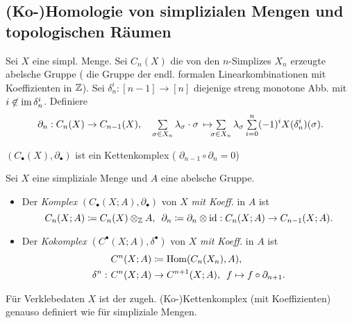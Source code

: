 \documentclass{cheat-sheet}
\newcommand{\nspace}[1]{\foreach \i in {1,...,#1}{ \! }} %
\begin{document}
\begin{samepage}
  \subsection{(Ko-)Homologie von simplizialen Mengen und topologischen Räumen}
\end{samepage}

\begin{defn}
  Sei $X$ eine simpl. Menge. Sei $C_n(X)$ die von den $n$-Simplizes $X_n$ erzeugte abelsche Gruppe (\dh{} die Gruppe der endl. formalen Linearkombinationen mit Koeffizienten in $\mathbb{Z}$). Sei $\delta_n^i : [n{-}1] \to [n]$ diejenige streng monotone Abb. mit $i \not\in \operatorname{im} \delta_n^i$. Definiere
  \[
    \partial_n : C_n(X) \to C_{n-1}(X), \quad
    \sum_{\sigma \in X_n} \lambda_\sigma \cdot \sigma \, \mapsto \nspace{3} \sum_{\sigma \in X_n} \lambda_\sigma \sum_{i=0}^n (-1)^i X(\delta_n^i)(\sigma).
  \]
\end{defn}

\begin{prop}
  $(C_\bullet(X),\partial_\bullet)$ ist ein Kettenkomplex (\dh{} $\partial_{n-1} \circ \partial_n = 0$)
\end{prop}

\begin{defn}
  Sei $X$ eine simpliziale Menge und $A$ eine abelsche Gruppe.
  \begin{itemize}
    \item Der \emph{Komplex} $(C_\bullet(X; A), \partial_\bullet)$ von $X$ \emph{mit Koeff.} in $A$ ist
    \[
      C_n(X; A) \coloneqq C_n(X) \otimes_{\mathbb{Z}} A, \enspace
      \partial_n \coloneqq \partial_n \otimes \operatorname{id} : C_n(X; A) \to C_{n-1}(X; A).
    \]
    \item Der \emph{Kokomplex} $(C^\bullet(X; A), \delta^\bullet)$ von $X$ \emph{mit Koeff.} in $A$ ist
    \begin{align*}
      & C^n(X; A) \coloneqq \operatorname{Hom}(C_n(X_n), A), \\
      \delta^n : \,\, & C^n(X; A) \to C^{n+1}(X; A), \enspace f \mapsto f \circ \partial_{n+1}.
    \end{align*}
  \end{itemize}
\end{defn}

\begin{defn}
  Für Verklebedaten $X$ ist der zugeh. (Ko-)Kettenkomplex (mit Koeffizienten) genauso definiert wie für simpliziale Mengen.
\end{defn}
\end{document}
